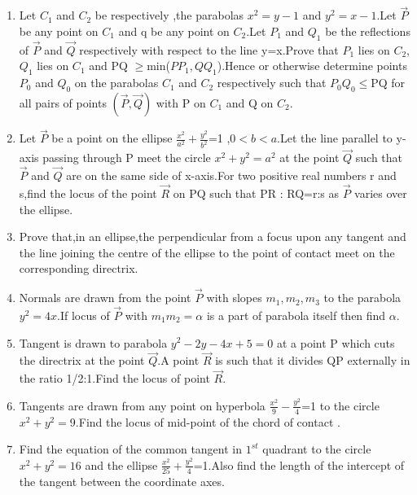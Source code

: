 \documentclass[journal,12pt,twocolumn]{IEEEtran}
\theoremstyle{remark}
\begin{document}
\begin{enumerate}
\hfill{}
\item Let $C_1$ and $C_2$ be respectively ,the parabolas $x^2=y-1$ and $y^2=x-1$.Let $\Vec{P}$ be any point on $C_1$ and q be any point on $C_2$.Let $P_1$ and $Q_1$ be the reflections of $\Vec{P}$ and $\Vec{Q}$ respectively with respect to the line y=x.Prove that $P_1$ lies on $C_2$,$Q_1$ lies on $C_1$ and PQ $\geq$min({$PP_1,QQ_1$}).Hence or otherwise determine points $P_0$ and $Q_0$ on the parabolas $C_1$ and $C_2$ respectively such that $P_0Q_0$$\leq$PQ for all pairs of points $(\Vec{P},\Vec{Q})$ with P on $C_1$ and Q on $C_2$.
\hfill{}
\item Let $\Vec{P}$ be a point on the ellipse $\frac{x^2}{a^2}+\frac{y^2}{b^2}$=1 ,$0<b<a$.Let the line parallel to y-axis passing through P meet the circle $x^2+y^2=a^2$ at the point $\Vec{Q}$ such that $\Vec{P}$ and $\Vec{Q}$ are on the same side of x-axis.For two positive real numbers r and s,find the locus of the point $\Vec{R}$ on PQ such that PR : RQ=r:s as $\Vec{P}$ varies over the ellipse.
\hfill{}
\item Prove that,in an ellipse,the perpendicular from a focus upon any tangent and the line joining the centre of the ellipse to the point of contact meet on the  corresponding directrix.
\\\hfill{}
\item Normals are drawn from the point $\Vec{P}$ with slopes $m_1,m_2,m_3$ to the parabola $y^2=4x$.If locus of $\Vec{P}$ with $m_1m_2=\alpha$ is a part of parabola itself then find $\alpha$.
\hfill{}  
\item Tangent is drawn to parabola $y^2-2y-4x+5=0$ at a point P which cuts the directrix at the point $\Vec{Q}$.A point $\Vec{R}$ is such that it divides QP externally in the ratio 1/2:1.Find the locus of point $\Vec{R}$.
\hfill{}
\item Tangents are drawn from any point on hyperbola $\frac{x^2}{9}-\frac{y^2}{4}$=1 to the circle $x^2+y^2=9$.Find the locus of mid-point of the chord of contact .
 \hfill{}
\item Find the equation of the common tangent in $1^{st}$ quadrant to the circle $x^2+y^2=16$ and the ellipse $\frac{x^2}{25}+\frac{y^2}{4}$=1.Also find the length of the intercept of the tangent between the coordinate axes.
\hfill{}
\end{enumerate}
\end{document}
